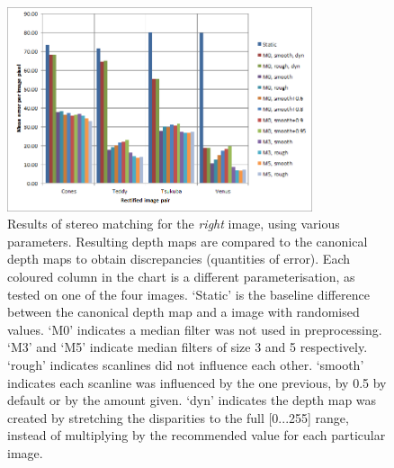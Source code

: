 \begin{figure}[h]
  \centering
  \includegraphics[width=0.8\textwidth]{Stereo-right-report}
  \caption[Results of stereo matching (left image)]{Results of stereo matching
    for the \emph{right} image, using various parameters. Resulting depth maps
    are compared to the canonical depth maps to obtain discrepancies (quantities
    of error). Each coloured column in the chart is a different
    parameterisation, as tested on one of the four images. `Static' is the
    baseline difference between the canonical depth map and a image with
    randomised values. `M0' indicates a median filter was not used in
    preprocessing. `M3' and `M5' indicate median filters of size 3 and 5
    respectively. `rough' indicates scanlines did not influence each other.
    `smooth' indicates each scanline was influenced by the one previous, by 0.5
    by default or by the amount given. `dyn' indicates the depth map was created
    by stretching the disparities to the full [0...255] range, instead of
    multiplying by the recommended value for each particular image.}
  \label{fig:stereo-right}
\end{figure}
